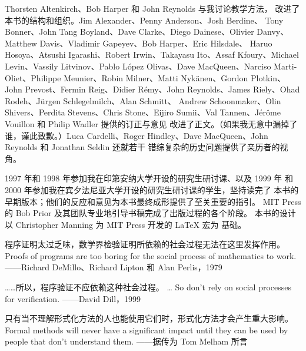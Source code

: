 Thorsten Altenkirch、Bob Harper 和 John Reynolds 与我讨论教学方法，
改进了本书的结构和组织。Jim Alexander、Penny Anderson、Josh Berdine、
Tony Bonner、John Tang Boyland、Dave Clarke、Diego Dainese、Olivier
Danvy、Matthew Davis、Vladimir Gapeyev、Bob Harper、Eric Hilsdale、
Haruo Hosoya、Atsushi Igarashi、Robert Irwin、Takayasu Ito、Assaf
Kfoury、Michael Levin、Vassily Litvinov、Pablo López Olivas、Dave
MacQueen、Narciso Marti-Oliet、Philippe Meunier、Robin Milner、Matti
Nykänen、Gordon Plotkin、John Prevost、Fermin Reig、Didier Rémy、John
Reynolds、James Riely、Ohad Rodeh、Jürgen Schlegelmilch、Alan Schmitt、
Andrew Schoonmaker、Olin Shivers、Perdita Stevens、Chris Stone、Eijiro
Sumii、Val Tannen、Jérôme Vouillon 和 Philip Wadler 提供的订正与意见
改进了正文。（如果我无意中漏掉了谁，谨此致歉。）Luca Cardelli、Roger
Hindley、Dave MacQueen、John Reynolds 和 Jonathan Seldin 还就若干
错综复杂的历史问题提供了亲历者的视角。

1997 年和 1998 年参加我在印第安纳大学开设的研究生研讨课、以及 1999 年
和 2000 年参加我在宾夕法尼亚大学开设的研究生研讨课的学生，坚持读完了
本书的早期版本；他们的反应和意见为本书最终成形提供了至关重要的指引。
MIT Press 的 Bob Prior 及其团队专业地引导书稿完成了出版过程的各个阶段。
本书的设计以 Christopher Manning 为 MIT Press 开发的 \LaTeX{} 宏为
基础。

\clearpage
\vspace*{\fill}
\bilingualepigraph
  {程序证明太过乏味，数学界检验证明所依赖的社会过程无法在这里发挥作用。\footnotemark}
  {Proofs of programs are too boring for the social process of mathematics
   to work.}
  {——Richard DeMillo、Richard Lipton 和 Alan Perlis，1979}

\bilingualepigraph
  {……所以，程序验证不应依赖这种社会过程。\footnotemark}
  {\ldots{} So don't rely on social processes for verification.}
  {——David Dill，1999}

\bilingualepigraph
  {只有当不理解形式化方法的人也能使用它们时，形式化方法才会产生重大影响。}
  {Formal methods will never have a significant impact until they can be used
   by people that don't understand them.}
  {——据传为 Tom Melham 所言}
\vspace*{\fill}

\endgroup
